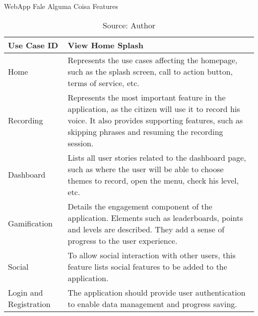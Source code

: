 \begin{table}[h]
    \centering
    \caption{WebApp Fale Alguma Coisa Features}
    \label{tab:falealgumacoisa-features}
    \begin{tabular}{|p{3cm}|p{10cm}|}
        \hline Use Case ID & View Home Splash \\
        \hline Home & Represents the use cases affecting the homepage, such as the splash screen, call to action button, terms of service, etc. \\
        \hline Recording & Represents the most important feature in the application, as the citizen will use it to record his voice. It also provides supporting features, such as skipping phrases and resuming the recording session.\\ 
        \hline Dashboard & Lists all user stories related to the dashboard page, such as where the user will be able to choose themes to record, open the menu, check his level, etc. \\
        \hline Gamification & Details the engagement component of the application. Elements such as leaderboards, points and levels are described. They add a sense of progress to the user experience. \\
        \hline Social & To allow social interaction with other users, this feature lists social features to be added to the application. \\
        \hline Login and Registration & The application should provide user authentication to enable data management and progress saving. \\
        \hline
    \end{tabular}
    \caption*{Source: Author}
\end{table}

